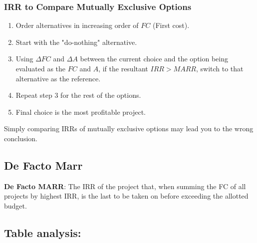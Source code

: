 \subsubsection{IRR to Compare Mutually Exclusive Options}
\begin{process}
    \begin{enumerate}
        \item Order alternatives in increasing order of $FC$ (First cost).
        
        \item Start with the "do-nothing" alternative.
        
        \item Using $\Delta FC$ and $\Delta A$ between the current choice and the option being evaluated as the $FC$ and $A$, if the resultant $IRR > MARR$, switch to that alternative as the reference.
        
        \item Repeat step 3 for the rest of the options.
        
        \item Final choice is the most profitable project.
    \end{enumerate}
\end{process}

\begin{warning}
    Simply comparing IRRs of mutually exclusive options may lead you to the wrong conclusion. 
\end{warning}

\begin{example}
\end{example}

\subsection{De Facto Marr}
\begin{definition}
    \textbf{De Facto MARR}: The IRR of the project that, when summing the FC of all projects by highest IRR, is the last to be taken on before exceeding the allotted budget.
\end{definition}

\subsection{Table analysis:}
\begin{example}
\end{example}